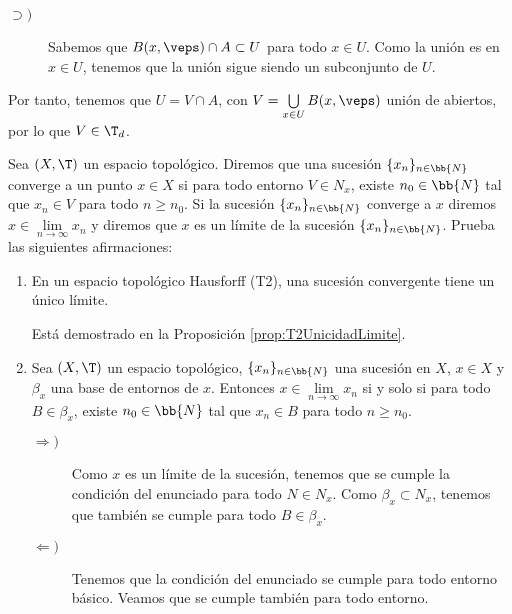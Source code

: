 \begin{ejercicio}
\begin{enumerate}
\begin{description}
\begin{description}
                \item[$\supset)$] Sabemos que $B(x,\veps)\cap A\subset U$ para todo $x\in U$. Como la unión es en $x\in U$, tenemos que la unión sigue siendo un subconjunto de $U$.
            \end{description}

            Por tanto, tenemos que $U=V\cap A$, con $V=\bigcup\limits_{x\in U}B(x,\veps)$ unión de abiertos, por lo que $V\in \T_d$.
        \end{description}
    \end{enumerate}
\end{ejercicio}

\begin{ejercicio} \label{ej:Sucesiones}
    Sea $(X,\T)$ un espacio topológico. Diremos que una sucesión $\{x_n\}_{n\in \bb{N}}$ converge a un punto $x\in X$ si para todo entorno $V\in {N}_x$, existe $n_0\in \bb{N}$ tal que $x_n\in V$ para todo $n\geq n_0$. Si la sucesión $\{x_n\}_{n\in \bb{N}}$ converge a $x$ diremos $x\in \lim\limits_{n\to \infty} x_n$ y diremos que $x$ es un límite de la sucesión $\{x_n\}_{n\in \bb{N}}$. Prueba las siguientes afirmaciones:
    \begin{enumerate}[label=\alph*)]
        \item En un espacio topológico Hausforff (T2), una sucesión convergente tiene un único límite.

        Está demostrado en la Proposición \ref{prop:T2UnicidadLimite}.

        \item Sea $(X, \T)$ un espacio topológico, $\{x_n\}_{n\in \bb{N}}$ una sucesión en $X$, $x\in X$ y $\beta_x$ una base de entornos de $x$. Entonces $x\in \lim\limits_{n\to \infty}x_n$ si y solo si para todo $B\in \beta_x$, existe $n_0\in \bb{N}$ tal que $x_n\in B$ para todo $n\geq n_0$.

        \begin{description}
            \item[$\Longrightarrow)$]
                Como $x$ es un límite de la sucesión, tenemos que se cumple la condición del enunciado para todo $N\in N_x$. Como $\beta_x\subset N_x$, tenemos que también se cumple para todo $B\in \beta_x$.
                
            \item[$\Longleftarrow)$]
                Tenemos que la condición del enunciado se cumple para todo entorno básico. Veamos que se cumple también para todo entorno.


\end{description}
\end{enumerate}
\end{ejercicio}
